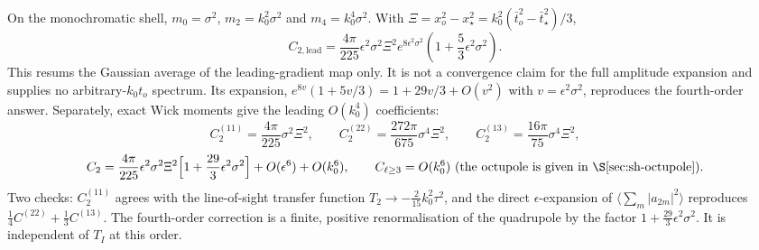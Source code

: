 \documentclass[11pt]{article}
\theoremstyle{definition}
\theoremstyle{remark}
\newcommand{\eps}{\epsilon}
\newcommand{\ens}[1]{\langle #1\rangle}
\begin{document}
On the monochromatic shell, $m_0=\sigma^2$, $m_2=k_0^2\sigma^2$ and
$m_4=k_0^4\sigma^2$. With $\Xi=x_o^2-x_\star^2=k_0^2(\bar t_o^2-\bar t_\star^2)/3$,
\begin{equation}\label{eq:sh-shell-resummed}
\boxed{\displaystyle
C_{2,\mathrm{lead}}=\frac{4\pi}{225}\eps^2\sigma^2\Xi^2
 e^{8\eps^2\sigma^2}\left(1+\frac53\eps^2\sigma^2\right).}
\end{equation}
This resums the Gaussian average of the leading-gradient map only. It is not a convergence
claim for the full amplitude expansion and supplies no arbitrary-$k_0t_o$ spectrum.
Its expansion, $e^{8v}(1+5v/3)=1+29v/3+O(v^2)$ with $v=\eps^2\sigma^2$, reproduces the
fourth-order answer. Separately, exact Wick moments give the leading $O(k_0^4)$ coefficients:
\[
C_2^{(11)}=\frac{4\pi}{225}\sigma^2\Xi^2,\qquad
C_2^{(22)}=\frac{272\pi}{675}\sigma^4\Xi^2,\qquad
C_2^{(13)}=\frac{16\pi}{75}\sigma^4\Xi^2,
\]
\[
C_2=\frac{4\pi}{225}\eps^2\sigma^2\Xi^2\Big[1+\frac{29}{3}\eps^2\sigma^2\Big]+O(\eps^6)+O(k_0^6),\qquad C_{\ell\ge3}=O(k_0^6)\ \text{(the octupole is given in \S\ref{sec:sh-octupole})}.
\]
Two checks: $C_2^{(11)}$ agrees with the line-of-sight transfer function
$T_2\to-\frac{2}{15}k_0^2\tau^2$, and the direct $\eps$-expansion of $\ens{\sum_m|a_{2m}|^2}$
reproduces $\frac14C^{(22)}+\frac13C^{(13)}$. The fourth-order correction is a finite, positive
renormalisation of the quadrupole by the factor $1+\frac{29}{3}\eps^2\sigma^2$. It is
independent of $T_I$ at this order.
\end{document}
